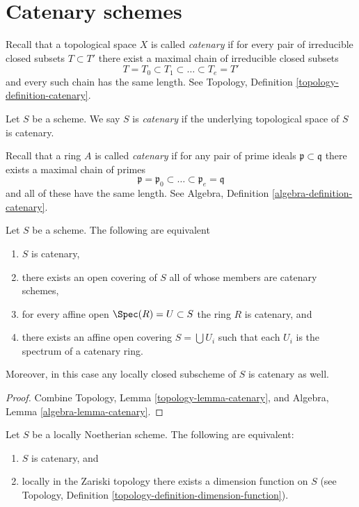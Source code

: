 \section{Catenary schemes}
\label{section-catenary}

\noindent
Recall that a topological space $X$ is called {\it catenary} if
for every pair of irreducible closed subsets $T \subset T'$
there exist a maximal chain of irreducible closed subsets
$$
T = T_0 \subset T_1 \subset \ldots \subset T_e = T'
$$
and every such chain has the same length. See
Topology, Definition \ref{topology-definition-catenary}.

\begin{definition}
\label{definition-catenary}
Let $S$ be a scheme. We say $S$ is {\it catenary} if the
underlying topological space of $S$ is catenary.
\end{definition}

\noindent
Recall that a ring $A$ is called {\it catenary} if
for any pair of prime ideals $\mathfrak p \subset \mathfrak q$
there exists a maximal chain of primes
$$
\mathfrak p =
\mathfrak p_0 \subset \ldots \subset \mathfrak p_e
= \mathfrak q
$$
and all of these have the same length. See
Algebra, Definition \ref{algebra-definition-catenary}.

\begin{lemma}
\label{lemma-catenary-local}
Let $S$ be a scheme. The following are equivalent
\begin{enumerate}
\item $S$ is catenary,
\item there exists an open covering of $S$ all of whose members are
catenary schemes,
\item for every affine open $\Spec(R) = U \subset S$ the ring
$R$ is catenary, and
\item there exists an affine open covering $S = \bigcup U_i$ such
that each $U_i$ is the spectrum of a catenary ring.
\end{enumerate}
Moreover, in this case any locally closed subscheme of $S$ is catenary
as well.
\end{lemma}

\begin{proof}
Combine Topology, Lemma \ref{topology-lemma-catenary}, and
Algebra, Lemma \ref{algebra-lemma-catenary}.
\end{proof}

\begin{lemma}
\label{lemma-catenary-dimension-function}
Let $S$ be a locally Noetherian scheme.
The following are equivalent:
\begin{enumerate}
\item $S$ is catenary, and
\item locally in the Zariski topology there exists a dimension function
on $S$ (see Topology, Definition \ref{topology-definition-dimension-function}).
\end{enumerate}
\end{lemma}

